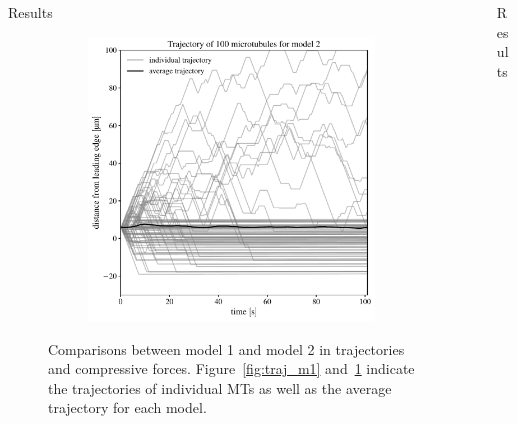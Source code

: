 \documentclass{beamer}
\newlength{\sepwidth}
\newlength{\colwidth}
\newcommand{\separatorcolumn}{\begin{column}{\sepwidth}\end{column}}
\begin{document}
\begin{frame}[t]
\begin{columns}[t]
\begin{column}{\colwidth}
\begin{block}{Results}
\begin{figure}
\begin{subfigure}{0.45\textwidth}
    \includegraphics[width=\linewidth]{../.figures/mt_trajectory_m2.pdf}
    \caption{\label{fig:traj_m2}}
    \end{subfigure}%
    \hfill
    \caption{\label{fig:three_comp}
        Comparisons between model 1 and model 2 in trajectories and compressive forces. Figure~\ref{fig:traj_m1} and~\ref{fig:traj_m2} indicate the trajectories of individual MTs as well as the average trajectory for each model.
    }
\end{figure}

\end{block}

\end{column}
\separatorcolumn%


\begin{column}{\colwidth}

\begin{block}{Results}


\end{block}
\end{column}
\end{columns}
\end{frame}
\end{document}
